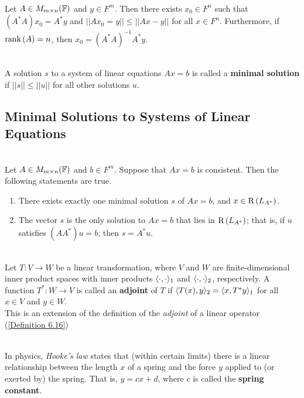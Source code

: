 \begin{theorem}
	\hfill\\
	Let $A \in M_{m \times n}(\mathbb{F})$ and $y \in F^m$. Then there exists $x_0 \in F^n$ such that $(A^*A)x_0 = A^*y$ and $||Ax_0 = y|| \leq ||Ax - y||$ for all $x \in F^n$. Furthermore, if $\text{rank}\left(A\right) = n$, then $x_0 = (A^*A)^{-1}A^*y$.
\end{theorem}

\begin{definition}
	\hfill\\
	A solution $s$ to a system of linear equations $Ax = b$ is called a \textbf{minimal solution} if $||s|| \leq ||u||$ for all other solutions $u$.
\end{definition}

\subsection*{Minimal Solutions to Systems of Linear Equations}

\begin{theorem}
	\hfill\\
	Let $A \in M_{m \times n}(\mathbb{F})$ and $b \in F^m$. Suppose that $Ax = b$ is consistent. Then the following statements are true.

	\begin{enumerate}
		\item There exists exactly one minimal solution $s$ of $Ax = b$, and $x \in \text{R}\left(L_{A^*}\right)$.
		\item The vector $s$ is the only solution to $Ax = b$ that lies in $\text{R}\left(L_{A^*}\right)$; that is, if $u$ satisfies $(AA^*)u = b$, then $s = A^*u$.
	\end{enumerate}
\end{theorem}

\begin{definition}
	\hfill\\
	Let $T: V \to W$ be a linear transformation, where $V$ and $W$ are finite-dimensional inner product spaces with inner products $\langle\cdot, \cdot\rangle_1$ and $\langle\cdot, \cdot\rangle_2$, respectively. A function $T^*: W \to V$ is called an \textbf{adjoint} of $T$ if $\langle T(x),y\rangle_2 = \langle x,T^*{y}\rangle_1$ for all $x \in V$ and $y \in W$.\\

	This is an extension of the definition of the \textit{adjoint} of a linear operator (\autoref{Definition 6.16})
\end{definition}

\begin{definition}
	\hfill\\
	In physics, \textit{Hooke's law} states that (within certain limits) there is a linear relationship between the length $x$ of a spring and the force $y$ applied to (or exerted by) the spring. That is, $y = cx + d$, where $c$ is called the \textbf{spring constant}.
\end{definition}
